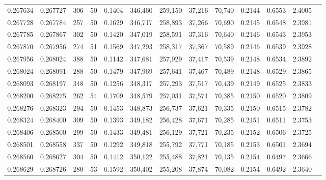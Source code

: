 \begin{tabular}{rrrrrrrrrrrrr}
0.267634 & 0.267727 &   306 &  50 &                                     0.1404 & 346,460 & 259,150 &  37,216 &  70,740 & 0.2144 & 0.6553 & 2.4005 \\
0.267728 & 0.267784 &   257 &  50 &                                     0.1629 & 346,717 & 258,893 &  37,266 &  70,690 & 0.2145 & 0.6548 & 2.3981 \\
0.267785 & 0.267867 &   302 &  50 &                                     0.1420 & 347,019 & 258,591 &  37,316 &  70,640 & 0.2146 & 0.6543 & 2.3953 \\
0.267870 & 0.267956 &   274 &  51 &                                     0.1569 & 347,293 & 258,317 &  37,367 &  70,589 & 0.2146 & 0.6539 & 2.3928 \\
0.267956 & 0.268024 &   388 &  50 &                                     0.1142 & 347,681 & 257,929 &  37,417 &  70,539 & 0.2148 & 0.6534 & 2.3892 \\
0.268024 & 0.268091 &   288 &  50 &                                     0.1479 & 347,969 & 257,641 &  37,467 &  70,489 & 0.2148 & 0.6529 & 2.3865 \\
0.268093 & 0.268197 &   348 &  50 &                                     0.1256 & 348,317 & 257,293 &  37,517 &  70,439 & 0.2149 & 0.6525 & 2.3833 \\
0.268200 & 0.268275 &   262 &  54 &                                     0.1709 & 348,579 & 257,031 &  37,571 &  70,385 & 0.2150 & 0.6520 & 2.3809 \\
0.268276 & 0.268323 &   294 &  50 &                                     0.1453 & 348,873 & 256,737 &  37,621 &  70,335 & 0.2150 & 0.6515 & 2.3782 \\
0.268324 & 0.268400 &   309 &  50 &                                     0.1393 & 349,182 & 256,428 &  37,671 &  70,285 & 0.2151 & 0.6511 & 2.3753 \\
0.268406 & 0.268500 &   299 &  50 &                                     0.1433 & 349,481 & 256,129 &  37,721 &  70,235 & 0.2152 & 0.6506 & 2.3725 \\
0.268501 & 0.268558 &   337 &  50 &                                     0.1292 & 349,818 & 255,792 &  37,771 &  70,185 & 0.2153 & 0.6501 & 2.3694 \\
0.268560 & 0.268627 &   304 &  50 &                                     0.1412 & 350,122 & 255,488 &  37,821 &  70,135 & 0.2154 & 0.6497 & 2.3666 \\
0.268629 & 0.268726 &   280 &  53 &                                     0.1592 & 350,402 & 255,208 &  37,874 &  70,082 & 0.2154 & 0.6492 & 2.3640 \\

\end{tabular}
